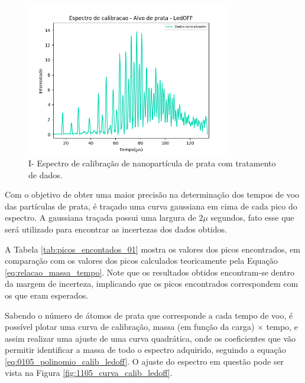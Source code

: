 \begin{figure}
  \centering  
  \includegraphics[width=0.8\textwidth]{exp_01/LedOFF_normalizado_mcp.png}
  \caption{I- Espectro de calibração de nanopartícula de prata com tratamento de dados.}
  \label{fig:0105_ledoff_dados_tratados} 
\end{figure}

\clearpage

Com o objetivo de obter uma maior precisão na determinação dos tempos de voo das partículas de prata, é traçado uma curva gaussiana em cima de cada pico do espectro. A gaussiana traçada possui uma largura de $2\mu$ segundos, fato esse que será utilizado para encontrar as incertezas dos dados obtidos.

A Tabela \ref{tab:picos_encontados_01} mostra os valores dos picos encontrados, em comparação com os valores dos picos calculados teoricamente pela Equação \ref{eq:relacao_massa_tempo}. Note que os resultados obtidos encontram-se dentro da margem de incerteza, implicando que os picos encontrados correspondem com os que eram esperados.



Sabendo o número de átomos de prata que corresponde a cada tempo de voo, é possível plotar uma curva de calibração, massa (em função da carga) $\times$ tempo, e assim realizar uma ajuste de uma curva quadrática, onde os coeficientes que vão permitir identificar a massa de todo o espectro adquirido, seguindo a equação \ref{eq:0105_polinomio_calib_ledoff}. O ajuste do espectro em questão pode ser vista na Figura \ref{fig:1105_curva_calib_ledoff}.

